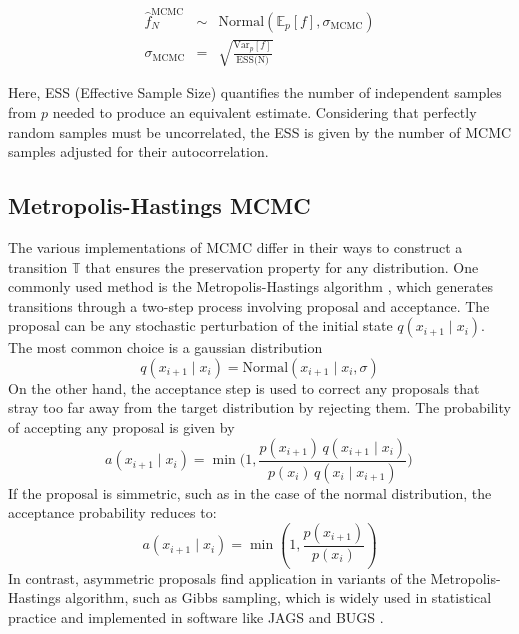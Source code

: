 \begin{eqnarray}
  \hat{f}^{\text{MCMC}}_N &\sim& \text{Normal} (\mathbb{E}_p[f], \sigma_{\text{MCMC}})\\
  \sigma_{\text{MCMC}} &=& \sqrt{\frac{\text{Var}_p[f]}{\text{ESS(N)}}}
\end{eqnarray}

Here, ESS (Effective Sample Size) quantifies the number of independent samples from $p$ needed to produce an equivalent
estimate. Considering that perfectly random samples must be uncorrelated, the ESS is given by the number of MCMC samples adjusted for their autocorrelation.

\subsection{Metropolis-Hastings MCMC}

The various implementations of MCMC differ in their ways to construct a transition $\mathbb T$ that ensures the
preservation property for any distribution. One commonly used method is the Metropolis-Hastings algorithm \cite{chib1995understanding}, which generates transitions through a two-step process involving proposal and acceptance. The proposal can be any stochastic perturbation of the initial state $q(x_{i+1}\mid x_{i})$. The most common choice is a gaussian distribution
\begin{equation}
  q(x_{i+1}\mid x_{i})=\text{Normal} (x_{i+1}\mid x_{i}, \sigma)
\end{equation}
On the other hand, the acceptance step is used to correct any proposals that stray too far away from the target distribution by rejecting them. The probability of accepting any proposal is given by
\begin{equation}
    a(x_{i+1}\mid x_i)=\operatorname*{min}\biggl(1,{\frac{p(x_{i+1})\,q(x_{i+1}\mid x_i)}{p(x_i)\,q(x_i\mid x_{i+1})}}\biggr)\,
\end{equation}
If the proposal is simmetric, such as in the case of the normal distribution, the acceptance probability reduces to:
\begin{equation}
    a(x_{i+1}\mid x_i)=\min \left( 1, \frac{p(x_{i+1})}{p(x_i)} \right)
\end{equation}
In contrast, asymmetric proposals find application in variants of the Metropolis-Hastings algorithm, such as Gibbs
sampling, which is widely used in statistical practice and implemented in software like JAGS \cite{plummer2003jags} and BUGS \cite{lunn2000winbugs}.

